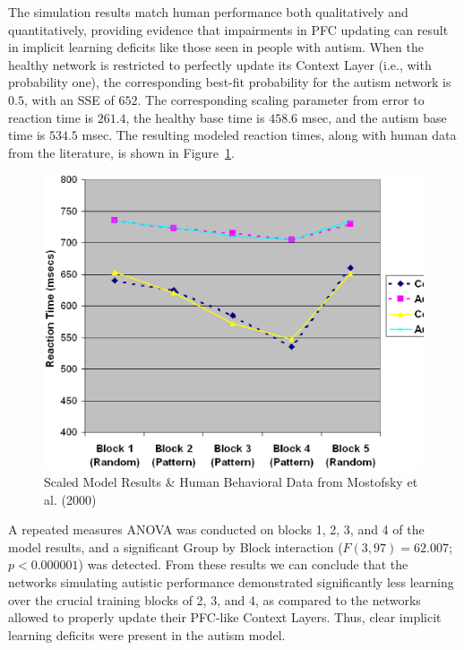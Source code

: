 The simulation results match human performance both qualitatively and quantitatively, providing evidence that impairments in PFC updating can result in implicit learning deficits like those seen in people with autism.  When the healthy network is restricted to perfectly update its Context Layer (i.e., with probability one), the corresponding best-fit probability for the autism network is $0.5$, with an SSE of $652$. The corresponding scaling parameter from error to reaction time is $261.4$, the healthy base time is $458.6$ msec, and the autism base time is $534.5$ msec.  The resulting modeled reaction times, along with human data from the literature, is shown in Figure~\ref{Model-Results}.

\begin{figure}[t]
\begin{center}
	\includegraphics[width=115mm]{graphs/srtt_chart.ps}
\end{center}
\caption{Scaled Model Results \& Human Behavioral Data from Mostofsky
         et al. (2000)} 
\label{Model-Results}
\end{figure} 

A repeated measures ANOVA was conducted on blocks 1, 2, 3, and 4 of the model results, and a significant Group by Block interaction ($F(3, 97) = 62.007$; $p < 0.000001$) was detected. From these results we can conclude that the networks simulating autistic performance demonstrated significantly less learning over the crucial training blocks of 2, 3, and 4, as compared to the networks allowed to properly update their PFC-like Context Layers.  Thus, clear implicit learning deficits were present in the autism model.

